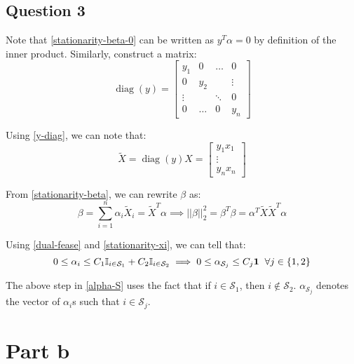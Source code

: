 \documentclass{article}
\newcommand{\xtilde}{\widetilde{X}}
\newcommand{\indi}{\mathbb{I}}
\newcommand{\setS}{\mathcal{S}}
\begin{document}
\subsection*{Question 3}
\begin{flushleft}
Note that \ref{stationarity-beta-0} can be written as \(y^{T}\alpha = 0\) by definition of the inner product. Similarly, construct a matrix:
\begin{equation}
\label{y-diag}
\mathop{diag}(y) = \begin{bmatrix} y_{1} & 0 & \ldots & 0 \\ 0 & y_{2} & & \vdots \\ \vdots & & \ddots & 0 \\ 0 & \ldots & 0 & y_{n} \end{bmatrix} 
\end{equation}

Using \ref{y-diag}, we can note that:
\begin{equation}
\label{x-tilde}
\xtilde = \mathop{diag}(y)X = \begin{bmatrix} y_{1}x_{1} \\ \vdots \\ y_{n}x_{n} \end{bmatrix}
\end{equation}

From \ref{stationarity-beta}, we can rewrite \(\beta\) as:
\begin{equation}
\label{beta-x-tilde}
\beta = \sum_{i=1}^{n} \alpha_{i}\xtilde_{i} = \xtilde^{T}\alpha \implies ||\beta||_{2}^{2} = \beta^{T}\beta = \alpha^{T}\xtilde\xtilde^{T}\alpha
\end{equation}

Using \ref{dual-fease} and \ref{stationarity-xi}, we can tell that:
\begin{equation}
\label{alpha-S}
0 \leq \alpha_{i} \leq C_{1}\indi_{i \in \setS_{1}} + C_{2}\indi_{i \in \setS_{2}} \implies 0 \leq \alpha_{\setS_{j}} \leq C_{j}\mathbf{1} \hspace{2mm} \forall j \in \{1, 2\}
\end{equation}

The above step in \ref{alpha-S} uses the fact that if \(i \in \setS_{1}\), then \(i \notin \setS_{2}\). \(\alpha_{\setS_{j}}\) denotes the vector of \(\alpha_{i}\)s such that \(i \in \setS_{j}\).

\end{flushleft}

\section*{Part b}
\end{document}
